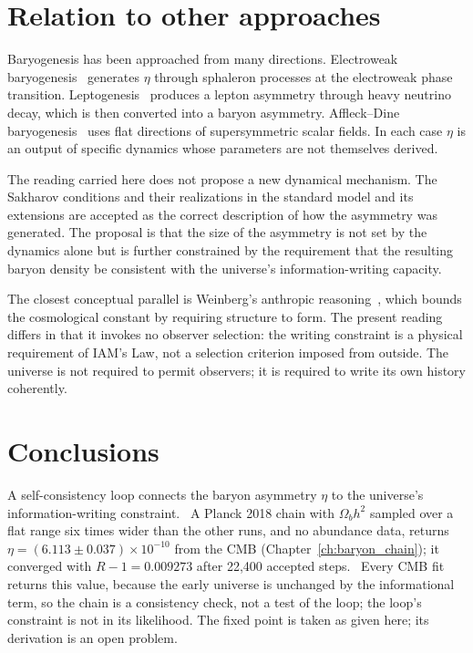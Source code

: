 \section{Relation to other approaches}\label{sec:bar_prior}
Baryogenesis has been approached from many directions. Electroweak baryogenesis~\cite{RubakovShaposhnikov1996} generates $\eta$ through
sphaleron processes at the electroweak phase transition. Leptogenesis~\cite{Davidson2008} produces a lepton asymmetry through heavy
neutrino decay, which is then converted into a baryon asymmetry. Affleck--Dine baryogenesis~\cite{AffleckDine1985} uses flat directions
of supersymmetric scalar fields. In each case $\eta$ is an output of specific dynamics whose parameters are not themselves derived.

The reading carried here does not propose a new dynamical mechanism. The Sakharov conditions and their realizations in the standard
model and its extensions are accepted as the correct description of how the asymmetry was generated. The proposal is that the size of
the asymmetry is not set by the dynamics alone but is further constrained by the requirement that the resulting baryon density be
consistent with the universe's information-writing capacity. \conjecture

The closest conceptual parallel is Weinberg's anthropic reasoning~\cite{Weinberg1989}, which bounds the cosmological constant by
requiring structure to form. The present reading differs in that it invokes no observer selection: the writing constraint is a
physical requirement of IAM's Law, not a selection criterion imposed from outside. The universe is not required to permit observers;
it is required to write its own history coherently. \interp

\section{Conclusions}\label{sec:bar_concl}
A self-consistency loop connects the baryon asymmetry $\eta$ to the universe's information-writing constraint. \conjecture\ A Planck 2018
chain with $\Omega_bh^2$ sampled over a flat range six times wider than the other runs, and no abundance data, returns
$\eta=(6.113\pm0.037)\times10^{-10}$ from the CMB (Chapter~\ref{ch:baryon_chain}); it converged with $R-1=0.009273$ after 22,400 accepted
steps. \measured\ Every CMB fit returns this value, because the early universe is unchanged by the informational term, so the chain is
a consistency check, not a test of the loop; the loop's constraint is not in its likelihood. The fixed point is taken as given here; its derivation is an open problem. \openprob

